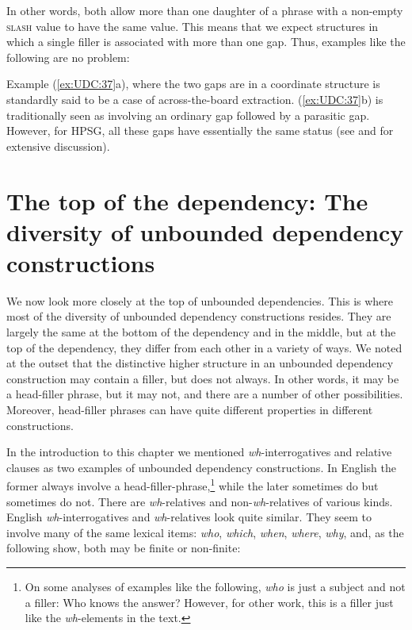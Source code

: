 \documentclass[output=paper
	        ,collection
	        ,collectionchapter
 	        ,biblatex
                ,babelshorthands
                ,newtxmath
                ,draftmode
                ,colorlinks, citecolor=brown
]{langscibook}
\begin{document}
{\noindent
In other words, both allow more than one daughter of a phrase with a
non-empty \textsc{slash} value to have the same value. This means that we expect
structures in which a single filler is associated with more than one
gap. Thus, examples like the following are no problem:

\begin{exe} \ex \begin{xlist} \label{ex:UDC:37}

\end{xlist}
\end{exe}

\noindent
Example (\ref{ex:UDC:37}a), where the two gaps are in a coordinate structure
is standardly said to be a case of across-the-board
extraction. (\ref{ex:UDC:37}b) is traditionally seen as involving an
ordinary gap followed by a parasitic gap. However, for HPSG, all these
gaps have essentially the same status (see \citealt{Levine:Hukari:06}
and \citealt{Chaves:12} for extensive discussion).

\section{The top of the dependency: The diversity of unbounded
dependency constructions}
\label{sec:UDC:Top}

We now look more closely at the top of unbounded dependencies. This is
where most of the diversity of unbounded dependency constructions
resides. They are largely the same at the bottom of the dependency and
in the middle, but at the top of the dependency, they differ from each
other in a variety of ways. We noted at the outset that the
distinctive higher structure in an unbounded dependency construction
may contain a filler, but does not always. In other words, it may be a
head-filler phrase, but it may not, and there are a number of other
possibilities. Moreover, head-filler phrases can have quite different
properties in different constructions.

In the introduction to this chapter we mentioned
\emph{wh}-interrogatives and relative clauses as two examples of
unbounded dependency constructions. In English the former always involve
a head-filler-phrase,\footnote{On some analyses of examples like the
  following, \emph{who} is just a subject and not a filler:
\ea
Who knows the answer?
\z
However, for other work, this is a filler just like the
  \emph{wh}-elements in the text.} while the later sometimes do but
sometimes do not. There are \emph{wh}-relatives and
non-\emph{wh}-relatives of various kinds. English
\emph{wh}-interrogatives and \emph{wh}-relatives look quite similar.
They seem to involve many of the same lexical items: \emph{who},
\emph{which}, \emph{when}, \emph{where}, \emph{why}, and, as the
following show, both may be finite or non-finite:

}
\end{document}
